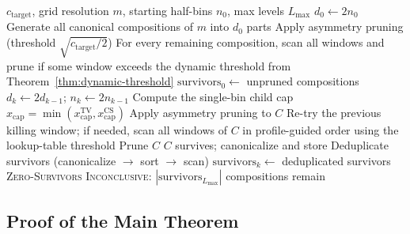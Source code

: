 \documentclass[11pt, letterpaper]{article}
\theoremstyle{paperplain}
\theoremstyle{paperdef}
\begin{document}
\begin{algorithm}[H]
\caption{Cascade Search For Terminal Coverage}
\label{alg:cascade}
\begin{algorithmic}[1]
\Require $c_{\text{target}}$, grid resolution $m$, starting half-bins
  $n_0$, max levels $L_{\max}$
\State $d_0 \gets 2 n_0$
\State Generate all canonical compositions of $m$ into $d_0$ parts
\State Apply asymmetry pruning (threshold
  $\sqrt{c_{\text{target}}/2}$)
\State For every remaining composition, scan all windows and prune if
  some window exceeds the dynamic threshold from
  Theorem~\ref{thm:dynamic-threshold}
\State $\text{survivors}_0 \gets$ unpruned compositions
  \State $d_k \gets 2 d_{k-1}$; \quad
    $n_k \gets 2 n_{k-1}$
  \State Compute the single-bin child cap
    $x_{\text{cap}} = \min(x_{\text{cap}}^{\mathrm{TV}},
    x_{\text{cap}}^{\mathrm{CS}})$
      \State Apply asymmetry pruning to $C$
        \State Re-try the previous killing window; if needed, scan all windows of $C$ in profile-guided order using the lookup-table threshold
          \State Prune $C$
        \Else
          \State $C$ survives; canonicalize and store
        \EndIf
      \EndIf
    \EndFor
  \EndFor
  \State Deduplicate survivors (canonicalize $\to$ sort $\to$ scan)
  \State $\text{survivors}_k \gets$ deduplicated survivors
    \State \Return \textsc{Zero-Survivors}
  \EndIf
\EndFor
\State \Return \textsc{Inconclusive}:
  $|\text{survivors}_{L_{\max}}|$ compositions remain
\end{algorithmic}
\end{algorithm}

\subsection{Proof of the Main Theorem}
\end{document}
